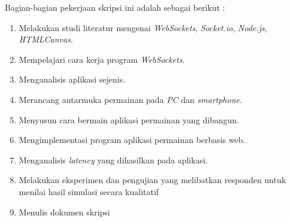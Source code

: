 \documentclass[a4paper,twoside]{article}
\begin{document}
Bagian-bagian pekerjaan skripsi ini adalah sebagai berikut :
	\begin{enumerate}
		\item Melakukan studi literatur mengenai \textit{WebSockets}, \textit{Socket.io}, \textit{Node.js}, \textit{HTMLCanvas}.
		\item Mempelajari cara kerja program \textit{WebSockets}.
		\item Menganalisis aplikasi sejenis.
		\item Merancang antarmuka permainan pada \textit{PC} dan \textit{smartphone}.
		\item Menyusun cara bermain aplikasi permainan yang dibangun.
		\item Mengimplementasi program aplikasi permainan berbasis web.
		\item Menganalisis \textit{latency} yang dihasilkan pada aplikasi.
		\item Melakukan eksperimen dan pengujian yang melibatkan responden untuk menilai hasil simulasi secara kualitatif
		\item Menulis dokumen skripsi
	\end{enumerate}
\end{document}
